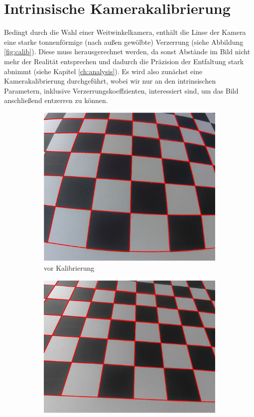 \section{Intrinsische Kamerakalibrierung}
\label{s:intrinsic}
Bedingt durch die Wahl einer Weitwinkelkamera, enthält die Linse der Kamera eine starke tonnenförmige (nach außen gewölbte) Verzerrung (siehe Abbildung \ref{fig:calib}). Diese muss herausgerechnet werden, da sonst Abstände im Bild nicht mehr der Realität entsprechen und dadurch die Präzision der Entfaltung stark abnimmt (siehe Kapitel \ref{ch:analysis}). Es wird also zunächst eine Kamerakalibrierung durchgeführt, wobei wir nur an den intrinsischen Parametern, inklusive Verzerrungskoeffzienten, interessiert sind, um das Bild anschließend entzerren zu können. 


\begin{figure}[!htb]
	\centering
\begin{subfigure}{.5\textwidth}
	\centering
	\includegraphics[scale=.35]{images/calibrationRaspi.eps}
	\caption{vor Kalibrierung}
	\label{fig:calibDist}
\end{subfigure}%
\begin{subfigure}{.5\textwidth}
	\centering
	\includegraphics[scale=.4]{images/calibrationRaspi2.eps}

\end{subfigure}
\end{figure}
